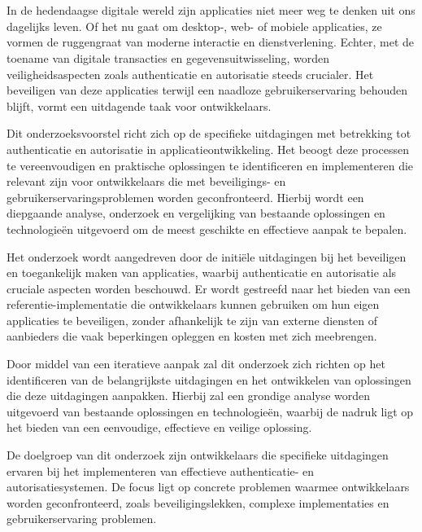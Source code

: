 
\chapter{}%
\label{ch:inleiding}

In de hedendaagse digitale wereld zijn applicaties niet meer weg te denken uit ons dagelijks leven. Of het nu gaat om desktop-, web- of mobiele applicaties, ze vormen de ruggengraat van moderne interactie en dienstverlening. Echter, met de toename van digitale transacties en gegevensuitwisseling, worden veiligheidsaspecten zoals authenticatie en autorisatie steeds crucialer. Het beveiligen van deze applicaties terwijl een naadloze gebruikerservaring behouden blijft, vormt een uitdagende taak voor ontwikkelaars.

Dit onderzoeksvoorstel richt zich op de specifieke uitdagingen met betrekking tot authenticatie en autorisatie in applicatieontwikkeling. Het beoogt deze processen te vereenvoudigen en praktische oplossingen te identificeren en implementeren die relevant zijn voor ontwikkelaars die met beveiligings- en gebruikerservaringsproblemen worden geconfronteerd. Hierbij wordt een diepgaande analyse, onderzoek en vergelijking van bestaande oplossingen en technologieën uitgevoerd om de meest geschikte en effectieve aanpak te bepalen.

Het onderzoek wordt aangedreven door de initiële uitdagingen bij het beveiligen en toegankelijk maken van applicaties, waarbij authenticatie en autorisatie als cruciale aspecten worden beschouwd. Er wordt gestreefd naar het bieden van een referentie-implementatie die ontwikkelaars kunnen gebruiken om hun eigen applicaties te beveiligen, zonder afhankelijk te zijn van externe diensten of aanbieders die vaak beperkingen opleggen en kosten met zich meebrengen.

Door middel van een iteratieve aanpak zal dit onderzoek zich richten op het identificeren van de belangrijkste uitdagingen en het ontwikkelen van oplossingen die deze uitdagingen aanpakken. Hierbij zal een grondige analyse worden uitgevoerd van bestaande oplossingen en technologieën, waarbij de nadruk ligt op het bieden van een eenvoudige, effectieve en veilige oplossing.

De doelgroep van dit onderzoek zijn ontwikkelaars die specifieke uitdagingen ervaren bij het implementeren van effectieve authenticatie- en autorisatiesystemen. De focus ligt op concrete problemen waarmee ontwikkelaars worden geconfronteerd, zoals beveiligingslekken, complexe implementaties en gebruikerservaring problemen.

